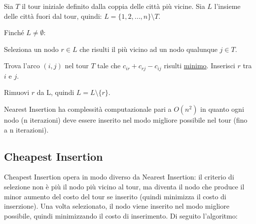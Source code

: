 \documentclass[a4paper,12pt]{report}
\begin{document}
\begin{tcolorbox}[colframe=black,colback=white,boxrule=0.5pt, sharp corners]
\begin{legal}
  \item Sia $T$ il tour iniziale definito dalla coppia delle città più vicine. Sia $L$ l'insieme delle città fuori dal tour, quindi: $L = \{1, 2, ..., n\} \setminus T$.
  \item Finché $L \neq \emptyset$:
  \begin{legal}
    \item Seleziona un nodo $r \in L$ che risulti il più vicino ad un nodo qualunque $j \in T$.
    \item Trova l'arco $(i, j)$ nel tour $T$ tale che $c_{ir} + c_{rj} - c_{ij}$ risulti \underline{minimo}. Inserisci $r$ tra $i$ e $j$.  
    \item Rimuovi $r$ da L, quindi $L = L \setminus \{r\}$.
  \end{legal}
\end{legal}
\end{tcolorbox}
\hfill \break Nearest Insertion ha complessità computazionale pari a $O(n^2)$ in quanto ogni nodo (n iterazioni) deve essere inserito nel modo migliore possibile nel tour (fino a n iterazioni).

\subsection{Cheapest Insertion}
Cheapest Insertion opera in modo diverso da Nearest Insertion: il criterio di selezione non è più il nodo più vicino al tour, ma diventa il nodo che produce il minor aumento del costo del tour se inserito (quindi minimizza il costo di inserzione). Una volta selezionato, il nodo viene inserito nel modo migliore possibile, quindi minimizzando il costo di inserimento. Di seguito l'algoritmo:
\end{document}
